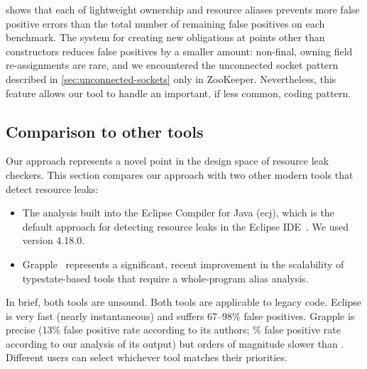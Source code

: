  shows that each of lightweight
ownership and resource aliases prevents more false positive errors than the total number
of remaining false positives on each benchmark.
The system for creating new obligations at points other than constructors reduces
false positives by a smaller amount: non-final, owning field re-assignments are rare,
and we encountered the unconnected socket pattern described in \cref{sec:unconnected-sockets}
only in ZooKeeper. Nevertheless, this feature allows our tool to handle an
important, if less common, coding pattern.

\subsection{Comparison to other tools}
\label{sec:compare}

Our approach represents a novel point in the design space of resource leak checkers.
%
This section compares our approach with two other modern tools that detect resource leaks:
\begin{itemize}
\item The analysis built into the Eclipse Compiler for Java (ecj), which is the default approach
  for detecting resource leaks in the Eclipse IDE~\cite{ecj-resource-leak}.
  We used version 4.18.0.
\item Grapple~\cite{zuo2019grapple} represents a significant, recent
  improvement in the scalability of typestate-based tools that require a whole-program alias analysis.
\end{itemize}
In brief, both tools are unsound.
Both tools are applicable to legacy code. %
Eclipse is very fast (nearly instantaneous) and suffers 67--98\% false
positives. %
Grapple is precise (13\% false positive rate
according to its authors; \% false positive rate according to our
analysis of its output) but orders
of magnitude slower than \tool.
Different users can select whichever tool matches
their priorities.



